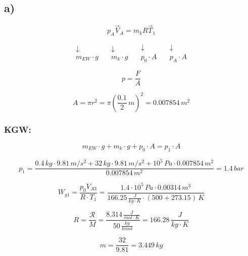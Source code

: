 

\subsection*{a)}

\[
p_A \vec{V}_A = m_k R \vec{T}_1
\]

\[
\begin{array}{c}
\downarrow \\
m_{EW} \cdot g
\end{array}
\quad
\begin{array}{c}
\downarrow \\
m_k \cdot g
\end{array}
\quad
\begin{array}{c}
\downarrow \\
p_0 \cdot A
\end{array}
\quad
\begin{array}{c}
\downarrow \\
p_A \cdot A
\end{array}
\]

\[
p = \frac{F}{A}
\]

\[
A = \pi r^2 = \pi \left( \frac{0.1}{2} \, m \right)^2 = 0.007854 \, m^2
\]

\subsubsection*{KGW:}

\[
m_{EW} \cdot g + m_k \cdot g + p_0 \cdot A = p_1 \cdot A
\]

\[
p_1 = \frac{0.4 \, kg \cdot 9.81 \, m/s^2 + 32 \, kg \cdot 9.81 \, m/s^2 + 10^5 \, Pa \cdot 0.007854 \, m^2}{0.007854 \, m^2} = 1.4 \, bar
\]

\[
W_{g1} = \frac{p_0 V_{A3}}{R \cdot T_1} = \frac{1.4 \cdot 10^5 \, Pa \cdot 0.00314 \, m^3}{166.25 \, \frac{J}{kg \cdot K} \cdot (500 + 273.15) \, K}
\]

\[
R = \frac{\mathcal{R}}{M} = \frac{8.314 \, \frac{J}{mol \cdot K}}{50 \, \frac{kg}{kmol}} = 166.28 \, \frac{J}{kg \cdot K}
\]

\[
m = \frac{32}{9.81} = 3.449 \, kg
\]